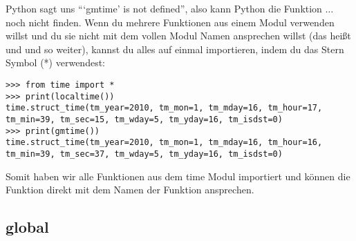 Python sagt uns ```gmtime' is not defined'', also kann Python die Funktion $\ldots$ noch nicht finden. Wenn du mehrere Funktionen aus einem Modul verwenden willst und du sie nicht mit dem vollen Modul Namen ansprechen willst (das heißt  und  und so weiter), kannst du alles auf einmal importieren, indem du das Stern Symbol (*) verwendest:

\begin{Verbatim}[frame=single]
>>> from time import *
>>> print(localtime())
time.struct_time(tm_year=2010, tm_mon=1, tm_mday=16, tm_hour=17, 
tm_min=39, tm_sec=15, tm_wday=5, tm_yday=16, tm_isdst=0)
>>> print(gmtime())
time.struct_time(tm_year=2010, tm_mon=1, tm_mday=16, tm_hour=16, 
tm_min=39, tm_sec=37, tm_wday=5, tm_yday=16, tm_isdst=0)
\end{Verbatim}

Somit haben wir alle Funktionen aus dem time Modul importiert und können die Funktion direkt mit dem Namen der Funktion ansprechen.

\subsection*{global}

